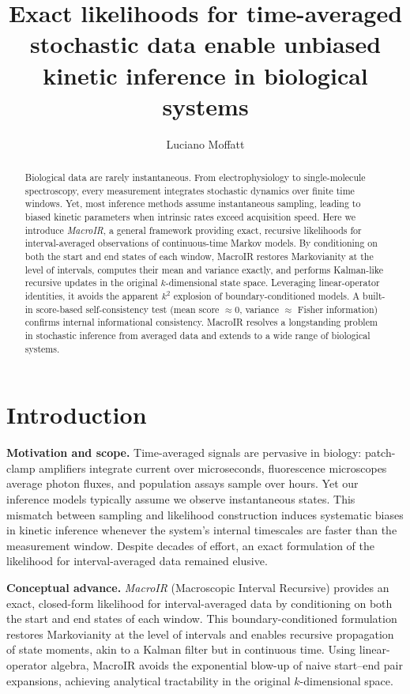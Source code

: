 \documentclass[9pt]{elife}
\title{Exact likelihoods for time-averaged stochastic data enable unbiased kinetic inference in biological systems}
\author[1*]{Luciano Moffatt}
\affil[1]{Instituto de Qu\'imica F\'isica de los Materiales, Medio Ambiente y Energ\'ia (INQUIMAE), CONICET; Facultad de Ciencias Exactas y Naturales, Universidad de Buenos Aires, Ciudad de Buenos Aires, C1428EHA, Argentina}
\begin{document}
\maketitle

\begin{abstract}
Biological data are rarely instantaneous. From electrophysiology to single-molecule spectroscopy, every measurement integrates stochastic dynamics over finite time windows. Yet, most inference methods assume instantaneous sampling, leading to biased kinetic parameters when intrinsic rates exceed acquisition speed. Here we introduce \emph{MacroIR}, a general framework providing exact, recursive likelihoods for interval-averaged observations of continuous-time Markov models. By conditioning on both the start and end states of each window, MacroIR restores Markovianity at the level of intervals, computes their mean and variance exactly, and performs Kalman-like recursive updates in the original $k$-dimensional state space. Leveraging linear-operator identities, it avoids the apparent $k^2$ explosion of boundary-conditioned models. A built-in score-based self-consistency test (mean score $\approx 0$, variance $\approx$ Fisher information) confirms internal informational consistency. MacroIR resolves a longstanding problem in stochastic inference from averaged data and extends to a wide range of biological systems.
\end{abstract}

\section*{Introduction}
\textbf{Motivation and scope.} Time-averaged signals are pervasive in biology: patch-clamp amplifiers integrate current over microseconds, fluorescence microscopes average photon fluxes, and population assays sample over hours. Yet our inference models typically assume we observe instantaneous states. This mismatch between sampling and likelihood construction induces systematic biases in kinetic inference whenever the system's internal timescales are faster than the measurement window. Despite decades of effort, an exact formulation of the likelihood for interval-averaged data remained elusive.

\textbf{Conceptual advance.} \emph{MacroIR} (Macroscopic Interval Recursive) provides an exact, closed-form likelihood for interval-averaged data by conditioning on both the start and end states of each window. This boundary-conditioned formulation restores Markovianity at the level of intervals and enables recursive propagation of state moments, akin to a Kalman filter but in continuous time. Using linear-operator algebra, MacroIR avoids the exponential blow-up of naive start--end pair expansions, achieving analytical tractability in the original $k$-dimensional space.
\end{document}
